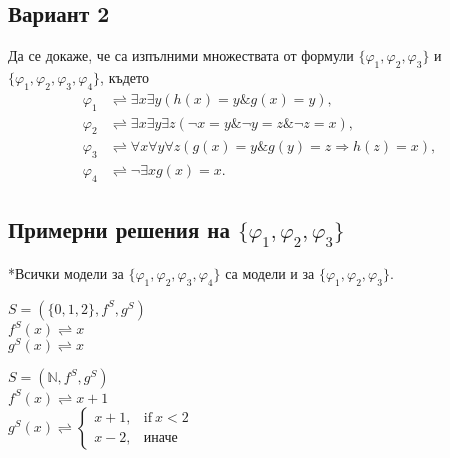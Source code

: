 \documentclass{article}
\renewcommand{\phi}{\varphi}
\theoremstyle{definition}
\newcommand{\Nat}{\mathbb{N}}
\renewcommand{\land}{\&}
\renewcommand{\phi}{\varphi}
\begin{document}
\subsection{Вариант 2}
Да се докаже, че са изпълними множествата от формули
$\{\phi_1,\phi_2,\phi_3\}$ и $\{\phi_1,\phi_2,\phi_3,\phi_4\}$, където
\begin{align*}
  \phi_1 & \rightleftharpoons \exists x \exists y (h(x) = y \land
  g(x) = y),
  \\
  \phi_2 & \rightleftharpoons \exists x \exists y \exists z (\neg
  x = y \land \neg y = z \land \neg z = x),
  \\
  \phi_3 & \rightleftharpoons \forall x \forall y \forall z
  (g(x) = y \land g(y) = z \Longrightarrow h(z) = x),
  \\
  \phi_4 & \rightleftharpoons \neg\exists x g(x)=x.
\end{align*}
\subsection{Примерни решения на $\{\phi_1,\phi_2,\phi_3\}$ }
*Всички модели за $\{\phi_1,\phi_2,\phi_3,\phi_4\}$ са модели и за $\{\phi_1,\phi_2,\phi_3\}$.\\
\begin{addmargin}[1em]{2em}
  \begin{center}
    $ S = ( \{0, 1, 2\}, f^S, g^S)$ \\
    $f^S(x)\rightleftharpoons x$\\
    $g^S(x)\rightleftharpoons x$
  \end{center}
\end{addmargin}
\vskip 0.2in
\begin{addmargin}[1em]{2em}
  \begin{center}
    $ S = (\Nat, f^S, g^S)$ \\
    $f^S(x)\rightleftharpoons x+1$\\
    $g^S(x)\rightleftharpoons
      \begin{cases}
        x+1, & \text{if}\ x<2 \\
        x-2, & \text{иначе}
      \end{cases}$
  \end{center}
\end{addmargin}
\end{document}
